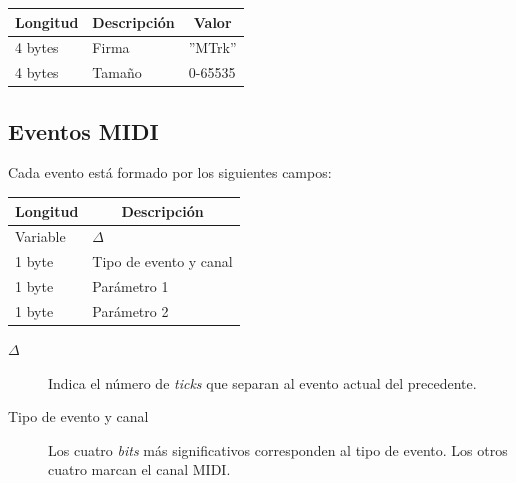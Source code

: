 \smallskip

\begin{center}
	\begin{tabular}{|l|l|l|}
		\hline \multicolumn{1}{|c|}{\textbf{Longitud}} & \multicolumn{1}{c|}{\textbf{Descripción}} & \multicolumn{1}{c|}{\textbf{Valor}} \\
		\hline 4 bytes & Firma & ''MTrk'' \\ 
		\hline 4 bytes & Tamaño & 0-65535 \\  
		\hline 
	\end{tabular}
	\smallskip
\end{center}

\smallskip

\subsection{Eventos MIDI}

Cada evento está formado por los siguientes campos:

\smallskip

\begin{center}
	\begin{tabular}{|l|l|}
		\hline \multicolumn{1}{|c|}{\textbf{Longitud}} & \multicolumn{1}{c|}{\textbf{Descripción}} \\
		\hline Variable & $\Delta$ \\ 
		\hline 1 byte & Tipo de evento y canal \\ 
		\hline 1 byte & Parámetro 1 \\ 
		\hline 1 byte & Parámetro 2 \\ 
		\hline 
	\end{tabular}
	\smallskip
\end{center}

\smallskip

\begin{description}
	\item[$\Delta$] Indica el número de \textit{ticks} que separan al evento actual del precedente.
	\item[Tipo de evento y canal] Los cuatro \textit{bits} más significativos corresponden al tipo de evento. Los otros cuatro marcan el canal \acrshort{MIDI}.
\end{description}

\smallskip

